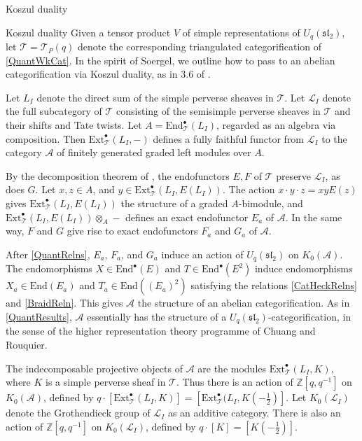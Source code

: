 \documentclass[12pt]{amsart}
\theoremstyle{definition}
\theoremstyle{remark}
\theoremstyle{remark}
\begin{document}
\begin{section}{Koszul duality}

\begin{subsection}{Koszul duality} \label{KoszDual} Given a tensor product $V$ of simple representations of $U_{q}(\mathfrak{sl}_{2})$, let $\mathcal{T} = \mathcal{T}_{P}(q)$ denote the corresponding triangulated categorification of \ref{QuantWkCat}. In the spirit of Soergel, we outline how to pass to an abelian categorification via Koszul duality, as in 3.6 of \cite{ZhengGeometricCategorificationTensorProducts}.

Let $L_{I}$ denote the direct sum of the simple perverse sheaves in $\mathcal{T} $. Let $\mathcal{L}_{I}$ denote the full subcategory of $\mathcal{T}$ consisting of the semisimple perverse sheaves in $\mathcal{T}$ and their shifts and Tate twists. Let $A = \text{End}^{\bullet}_{\mathcal{T}}(L_{I})$, regarded as an algebra via composition. Then $\text{Ext}^{\bullet}_{\mathcal{T} }(L_{I},-)$ defines a fully faithful functor from $\mathcal{L}_{I}$ to the category $\mathcal{A}$ of finitely generated graded left modules over $A$.

By the decomposition theorem of \cite{BeilinsonBernsteinDeligneFaisceauxPervers}, the endofunctors $E,F$ of $\mathcal{T} $ preserve $\mathcal{L}_{I}$, as does $G$. Let $x,z \in A$, and $y \in \text{Ext}^{\bullet}_{\mathcal{T}}(L_{I},E(L_{I}))$. The action $x \cdot y \cdot z = xyE(z)$ gives $\text{Ext}^{\bullet}_{\mathcal{T}}(L_{I},E(L_{I}))$ the structure of a graded $A$-bimodule, and $\text{Ext}^{\bullet}_{\mathcal{T}}(L_{I},E(L_{I})) \otimes_{A} -$ defines an exact endofunctor $E_{a}$ of $\mathcal{A}$. In the same way, $F$ and $G$ give rise to exact endofunctors $F_{a}$ and $G_{a}$ of $\mathcal{A}$. 

After \ref{QuantRelns}, $E_{a}$, $F_{a}$, and $G_{a}$ induce an action of $U_{q}(\mathfrak{sl}_{2})$ on $K_{0}(\mathcal{A})$. The endomorphisms $X \in \text{End}^{\bullet}(E)$ and $T \in \text{End}^{\bullet}(E^{2})$ induce endomorphisms $X_{a} \in \text{End}(E_{a})$ and $T_{a} \in \text{End}((E_{a})^{2})$ satisfying the relations \ref{CatHeckRelns} and \ref{BraidReln}. This gives $\mathcal{A}$ the structure of an abelian categorification. As in \ref{QuantResults}, $\mathcal{A}$ essentially has the structure of a $U_{q}(\mathfrak{sl}_{2})$-categorification, in the sense of the higher representation theory programme of Chuang and Rouquier.

The indecomposable projective objects of $\mathcal{A}$ are the modules $\text{Ext}^{\bullet}_{\mathcal{T}}(L_{I},K)$, where $K$ is a simple perverse sheaf in $\mathcal{T}$. Thus there is an action of $\mathbb{Z}[q,q^{-1}]$ on $K_{0}(\mathcal{A})$, defined by $q \cdot [\text{Ext}^{\bullet}_{\mathcal{T}}(L_{I},K)] = [\text{Ext}^{\bullet}_{\mathcal{T}}(L_{I},K(-\frac{1}{2})]$. Let $K_{0}(\mathcal{L}_{I})$ denote the Grothendieck group of $\mathcal{L}_{I}$ as an additive category. There is also an action of $\mathbb{Z}[q,q^{-1}]$ on $K_{0}(\mathcal{L}_{I})$, defined by $q \cdot [K] = [K (-\frac{1}{2})]$. 


\end{subsection}
\end{section}
\end{document}
